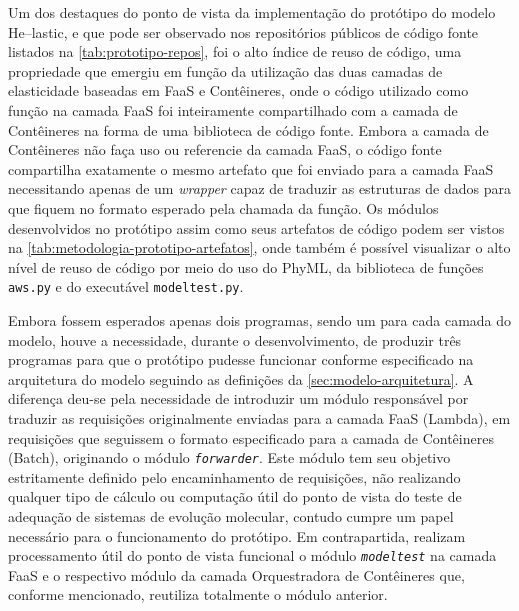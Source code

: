 \documentclass[english,brazilian]{UNISINOSmonografia} %
\begin{document}
Um dos destaques do ponto de vista da implementação do protótipo do modelo \textsf{He}--lastic, e que pode ser observado nos repositórios públicos de código fonte listados na \autoref{tab:prototipo-repos}, foi o alto índice de reuso de código, uma propriedade que emergiu em função da utilização das duas camadas de elasticidade baseadas em FaaS e Contêineres, onde o código utilizado como função na camada FaaS foi inteiramente compartilhado com a camada de Contêineres na forma de uma biblioteca de código fonte.
%
Embora a camada de Contêineres não faça uso ou referencie da camada FaaS, o código fonte compartilha exatamente o mesmo artefato que foi enviado para a camada FaaS necessitando apenas de um \textit{wrapper} capaz de traduzir as estruturas de dados para que fiquem no formato esperado pela chamada da função.
%
Os módulos desenvolvidos no protótipo assim como seus artefatos de código podem ser vistos na \autoref{tab:metodologia-prototipo-artefatos}, onde também é possível visualizar o alto nível de reuso de código por meio do uso do PhyML, da biblioteca de funções \texttt{aws.py} e do executável \texttt{modeltest.py}.


Embora fossem esperados apenas dois programas, sendo um para cada camada do modelo, houve a necessidade, durante o desenvolvimento, de produzir três programas para que o protótipo pudesse funcionar conforme especificado na arquitetura do modelo seguindo as definições da \autoref{sec:modelo-arquitetura}.
%
A diferença deu-se pela necessidade de introduzir um módulo responsável por traduzir as requisições originalmente enviadas para a camada FaaS (Lambda), em requisições que seguissem o formato especificado para a camada de Contêineres (Batch), originando o módulo \textit{\texttt{forwarder}}.
%
Este módulo tem seu objetivo estritamente definido pelo encaminhamento de requisições, não realizando qualquer tipo de cálculo ou computação útil do ponto de vista do teste de adequação de sistemas de evolução molecular, contudo cumpre um papel necessário para o funcionamento do protótipo.
%
Em contrapartida, realizam processamento útil do ponto de vista funcional o módulo \textit{\texttt{modeltest}} na camada FaaS e o respectivo módulo da camada Orquestradora de Contêineres que, conforme mencionado, reutiliza totalmente o módulo anterior.
\end{document}
